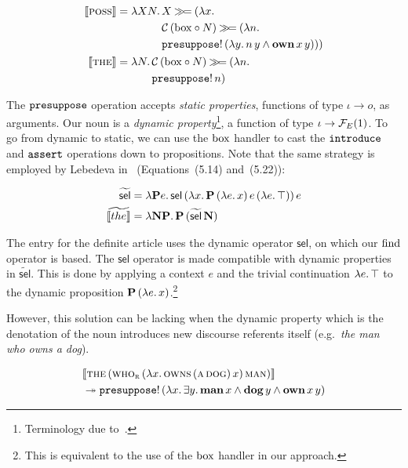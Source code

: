 \begin{align*}
  \llbracket \textsc{poss} \rrbracket &= \lambda X N.\, \begin{aligned}[t]
      &X \mathbin{\gg\!=} (\lambda x.\,  \\
      &\mathcal{C}\,(\mathrm{box} \circ N) \mathbin{\gg\!=} (\lambda n.\,  \\
      &\mathtt{presuppose}!\,(\lambda y.\, n\,y \land \textbf{own}\,x\,y)))
    \end{aligned} \\
  \llbracket \textsc{the} \rrbracket &= \lambda N.\, \begin{aligned}[t]
      &\mathcal{C}\,(\mathrm{box} \circ N) \mathbin{\gg\!=} (\lambda n.\,  \\
      &\mathtt{presuppose}!\,n)
    \end{aligned}
\end{align*}

The $\mathtt{presuppose}$ operation accepts \emph{static properties}, functions
of type $\iota \to o$, as arguments. Our noun is a \emph{dynamic
  property}\footnote{Terminology due to~\cite{lebedeva2012expression}.}, a
function of type $\iota \to \mathcal{F}_E(1)$. To go from dynamic to static, we can
use the $\mathrm{box}$ handler to cast the $\mathtt{introduce}$ and $\mathtt{assert}$
operations down to propositions. Note that the same strategy is employed by
Lebedeva in~\cite{lebedeva2012expression} (Equations~(5.14) and~(5.22)):

\begin{align*}
  \widetilde{\textsf{sel}} &= \lambda \textbf{P} e.\, \textsf{sel}\,(\lambda x.\, \textbf{P}\,(\lambda e.\, x)\,e\,(\lambda e.\, \top))\,e \\
  \widetilde{\llbracket the \rrbracket} &= \lambda \textbf{N} \textbf{P}.\, \textbf{P}\,(\widetilde{\textsf{sel}}\,\textbf{N})
\end{align*}

The entry for the definite article uses the dynamic operator
$\textsf{sel}$, on which our $\operatorname{find}$ operator is based. The $\textsf{sel}$
operator is made compatible with dynamic properties in
$\widetilde{\textsf{sel}}$. This is done by applying a context $e$ and the
trivial continuation $\lambda e.\, \top$ to the dynamic proposition
$\textbf{P}\,(\lambda e.\, x)$.\footnote{This is equivalent to the use of
  the $\mathrm{box}$ handler in our approach.}

However, this solution can be lacking when the dynamic property which is
the denotation of the noun introduces new discourse referents itself (e.g.\
\emph{the man who owns a dog}).

\begin{align*}
& \llbracket \textsc{the}\,(\textsc{who}_{\textsc{r}}\,(\lambda x.\, \textsc{owns}\,(\textsc{a}\,\textsc{dog})\,x)\,\textsc{man}) \rrbracket \\
& \twoheadrightarrow \mathtt{presuppose}!\,(\lambda x.\, \exists y.\, \textbf{man}\,x \land
  \textbf{dog}\,y \land \textbf{own}\,x\,y)
\end{align*}

